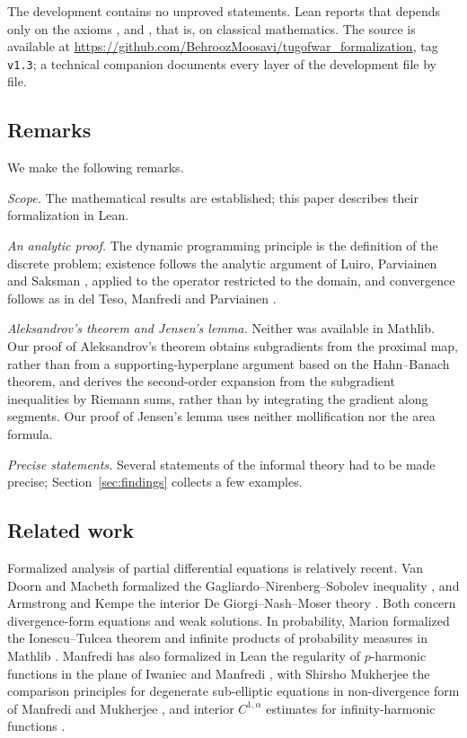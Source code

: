 \documentclass[11pt,reqno]{amsart}
\theoremstyle{plain}
\theoremstyle{definition}
\theoremstyle{remark}
\begin{document}
The development contains no unproved statements. Lean reports that
 depends only on the axioms
,  and ,
that is, on classical mathematics. The source is
available at
\url{https://github.com/BehroozMoosavi/tugofwar_formalization}, tag
\texttt{v1.3}; a technical companion \cite{MMcomp} documents every layer of
the development file by file.

\subsection*{Remarks}
We make the following remarks.

\emph{Scope.} The mathematical results are established; this paper describes
their formalization in Lean.

\emph{An analytic proof.} The dynamic programming principle is the definition
of the discrete problem;
existence follows the analytic argument of Luiro, Parviainen and Saksman
\cite{LPS14}, applied to the operator restricted to the domain, and
convergence follows as in del Teso, Manfredi and Parviainen \cite{dTMP22}.

\emph{Aleksandrov's theorem and Jensen's lemma.} Neither was available in
Mathlib. Our proof of Aleksandrov's theorem \cite{Ale39} obtains subgradients
from the proximal map, rather than from a supporting-hyperplane argument based
on the Hahn--Banach theorem, and derives the second-order expansion from the
subgradient inequalities by Riemann sums, rather than by integrating the
gradient along segments. Our proof of Jensen's lemma \cite{Jen88} uses neither
mollification nor the area formula.

\emph{Precise statements.} Several statements of the informal theory
had to be made precise; Section~\ref{sec:findings} collects a few examples.

\subsection*{Related work}
Formalized analysis of partial differential equations is relatively recent.
Van Doorn and Macbeth formalized the Gagliardo--Nirenberg--Sobolev inequality
\cite{vDM24}, and Armstrong and Kempe the interior De Giorgi--Nash--Moser
theory \cite{AK26}. Both concern divergence-form equations and weak solutions.
In probability, Marion formalized the Ionescu--Tulcea theorem and infinite
products of probability measures in Mathlib \cite{Mar26}. Manfredi has
also formalized in Lean the regularity of $p$-harmonic functions in the plane
of Iwaniec and Manfredi \cite{IMlean}, with Shirsho Mukherjee the comparison
principles for degenerate sub-elliptic equations in non-divergence form of
Manfredi and Mukherjee \cite{MMulean}, and interior $C^{1,\alpha}$ estimates
for infinity-harmonic functions \cite{InfHlean}.
\end{document}
